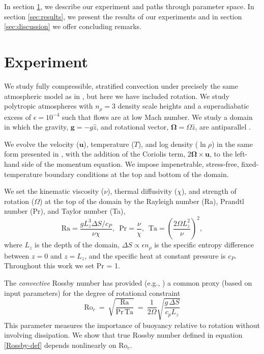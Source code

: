 \documentclass[twocolumn, amsmath, amsfonts, amssymb]{aastex62}
\newcommand{\con}{\ensuremath{\text{Ro}_{c}}}
\newcommand{\gv}[1]{{\color{blue} #1}}
\begin{document}
In section  \ref{sec:experiment}, we describe our experiment and paths through parameter space. 
In section \ref{sec:results}, we present the results of our experiments and in section \ref{sec:discussion} we offer concluding remarks.

\section{Experiment} 
\label{sec:experiment}
We study fully compressible, stratified 
convection under precisely the same atmospheric model
as in \AB, but here
we have included rotation. We study polytropic atmospheres
with $n_\rho = 3$ density scale heights and a superadiabatic
excess of $\epsilon = 10^{-4}$ such that flows are at low Mach number.
We study a domain in which the
gravity, $\bm{g} = -g\hat{z}$, and rotational vector, $\bm{\Omega} = \Omega \hat{z}$, 
are antiparallel \citep[as in e.g.,][]{julien&all1996, brummell&all1996}.

We evolve the velocity ($\bm{u}$), temperature ($T$), 
and log density ($\ln\rho$) in the same form presented in \AB, with the
addition of the Coriolis term, $2\bm{\Omega}\times\bm{u}$, to the left-hand side
of the momentum equation. 
We impose impenetrable, stress-free, fixed-temperature boundary conditions at the top and bottom of the domain.


We set the kinematic viscosity ($\nu$), thermal diffusivity ($\chi$), and strength of
rotation ($\Omega$) at the top of the domain by the Rayleigh number 
(Ra), Prandtl number (Pr), and Taylor number (Ta),
\begin{equation}
    \text{Ra} = \frac{g L_z^3 \Delta S / c_P}{\nu \chi}, \,\,\,
    \text{Pr} = \frac{\nu}{\chi}, \,\,\,
    \text{Ta} = \left(\frac{2 \Omega L_z^2}{\nu}\right)^2,
\end{equation}
where $L_z$ is the depth of the domain, 
$\Delta S \propto \epsilon n_\rho$ is the specific entropy difference between
$z = 0$ and $z = L_z$, and the specific heat at constant pressure is $c_P$.
Throughout this work we set Pr = 1.

\gv{The \textit{convective} Rossby number has provided (e.g., \cite{julien&all1996, brummell&all1996}) a common proxy (based on input parameters) for the degree of rotational constraint  
\begin{equation}
\con \ = \   \sqrt{ \frac{\text{Ra}}{\text{Pr}\, \text{Ta} } } \ = \  \frac{1}{2 \Omega } \sqrt{\frac{g \, \Delta  S}{c_{p} L_{z}}}
\end{equation}
This parameter measures the importance of buoyancy relative to rotation without involving dissipation. We show that true Rossby number defined in equation \ref{Rossby-def} depends nonlinearly on $\con$.  
}
\end{document}
